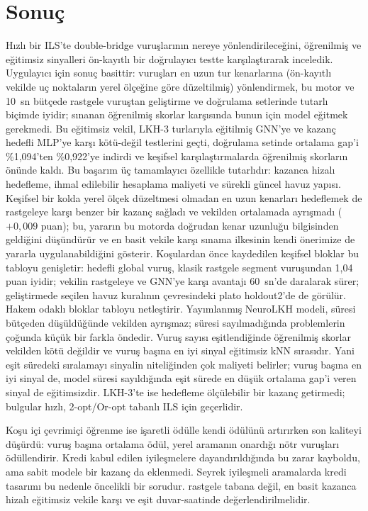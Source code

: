 \documentclass[pdflatex,sn-basic]{sn-jnl}
\begin{document}
\section{Sonuç}\label{sec:sonuc}

Hızlı bir ILS'te double-bridge vuruşlarının nereye yönlendirileceğini, öğrenilmiş ve eğitimsiz
sinyalleri ön-kayıtlı bir doğrulayıcı testte karşılaştırarak inceledik. Uygulayıcı için sonuç
basittir: vuruşları en uzun tur kenarlarına (ön-kayıtlı vekilde uç noktaların yerel ölçeğine göre
düzeltilmiş) yönlendirmek, bu motor ve 10~sn bütçede rastgele vuruştan geliştirme ve doğrulama
setlerinde tutarlı biçimde iyidir; sınanan öğrenilmiş skorlar karşısında bunun için model eğitmek
gerekmedi. Bu eğitimsiz vekil, LKH-3 turlarıyla eğitilmiş GNN'ye ve kazanç hedefli MLP'ye karşı
kötü-değil testlerini geçti, doğrulama setinde ortalama gap'i \%1,094'ten \%0,922'ye indirdi ve
keşifsel karşılaştırmalarda öğrenilmiş skorların önünde kaldı.
Bu başarım üç tamamlayıcı özellikle tutarlıdır: kazanca hizalı hedefleme, ihmal edilebilir
hesaplama maliyeti ve sürekli güncel havuz yapısı. Keşifsel bir kolda yerel ölçek düzeltmesi olmadan en
uzun kenarları hedeflemek de rastgeleye karşı benzer bir kazanç sağladı ve vekilden ortalamada
ayrışmadı ($+0{,}009$ puan); bu, yararın bu motorda doğrudan kenar uzunluğu bilgisinden geldiğini
düşündürür ve en basit vekile karşı sınama ilkesinin kendi önerimize de yararla uygulanabildiğini
gösterir.
Koşulardan önce kaydedilen keşifsel bloklar bu tabloyu genişletir: hedefli global vuruş, klasik
rastgele segment vuruşundan 1,04 puan iyidir; vekilin rastgeleye ve GNN'ye karşı avantajı 60~sn'de
daralarak sürer; geliştirmede seçilen havuz kuralının çevresindeki plato holdout2'de de görülür.
Hakem odaklı bloklar tabloyu netleştirir. Yayımlanmış NeuroLKH modeli, süresi bütçeden düşüldüğünde
vekilden ayrışmaz; süresi sayılmadığında problemlerin çoğunda küçük bir farkla öndedir. Vuruş sayısı
eşitlendiğinde öğrenilmiş skorlar vekilden kötü değildir ve vuruş başına en iyi sinyal eğitimsiz kNN
sırasıdır. Yani eşit süredeki sıralamayı sinyalin niteliğinden çok maliyeti belirler; vuruş başına en iyi
sinyal de, model süresi sayıldığında eşit sürede en düşük ortalama gap'i veren sinyal de eğitimsizdir. LKH-3'te ise hedefleme ölçülebilir bir kazanç getirmedi; bulgular hızlı,
2-opt/Or-opt tabanlı ILS için geçerlidir.

Koşu içi çevrimiçi öğrenme ise işaretli ödülle kendi ödülünü artırırken son kaliteyi düşürdü: vuruş
başına ortalama ödül, yerel aramanın onardığı nötr vuruşları ödüllendirir. Kredi kabul edilen
iyileşmelere dayandırıldığında bu zarar kayboldu, ama sabit modele bir kazanç da eklenmedi. Seyrek
iyileşmeli aramalarda kredi tasarımı bu nedenle öncelikli bir sorudur.
rastgele tabana değil, en basit kazanca hizalı eğitimsiz vekile karşı ve eşit duvar-saatinde
değerlendirilmelidir.
\end{document}
